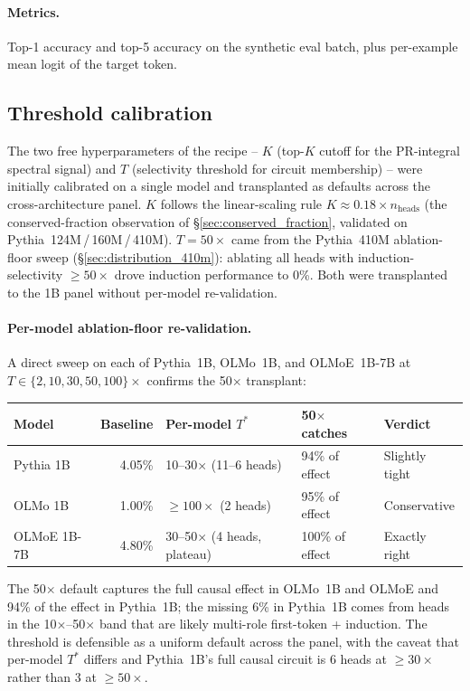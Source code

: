 \documentclass[11pt]{article}
\begin{document}
\paragraph{Metrics.} Top-1 accuracy and top-5 accuracy on the synthetic eval batch, plus per-example mean logit of the target token.

\subsection{Threshold calibration}
\label{sec:threshold_calibration}

The two free hyperparameters of the recipe -- $K$ (top-$K$ cutoff for the PR-integral spectral signal) and $T$ (selectivity threshold for circuit membership) -- were initially calibrated on a single model and transplanted as defaults across the cross-architecture panel. $K$ follows the linear-scaling rule $K \approx 0.18 \times n_{\mathrm{heads}}$ (the conserved-fraction observation of \S\ref{sec:conserved_fraction}, validated on Pythia~124M\,/\,160M\,/\,410M). $T = 50\times$ came from the Pythia~410M ablation-floor sweep (\S\ref{sec:distribution_410m}): ablating all heads with induction-selectivity $\geq 50\times$ drove induction performance to 0\%. Both were transplanted to the 1B panel without per-model re-validation.

\paragraph{Per-model ablation-floor re-validation.} A direct sweep on each of Pythia~1B, OLMo~1B, and OLMoE~1B-7B at $T \in \{2, 10, 30, 50, 100\}\times$ confirms the 50$\times$ transplant:

\begin{center}
\footnotesize
\begin{tabular}{lrlll}
\toprule
Model & Baseline & Per-model $T^*$ & 50$\times$ catches & Verdict \\
\midrule
Pythia 1B   & 4.05\% & 10--30$\times$ (11--6 heads) & 94\% of effect & Slightly tight \\
OLMo 1B     & 1.00\% & $\geq 100\times$ (2 heads) & 95\% of effect & Conservative \\
OLMoE 1B-7B & 4.80\% & 30--50$\times$ (4 heads, plateau) & 100\% of effect & Exactly right \\
\bottomrule
\end{tabular}
\end{center}

The 50$\times$ default captures the full causal effect in OLMo~1B and OLMoE and 94\% of the effect in Pythia~1B; the missing 6\% in Pythia~1B comes from heads in the 10$\times$--50$\times$ band that are likely multi-role first-token + induction. The threshold is defensible as a uniform default across the panel, with the caveat that per-model $T^*$ differs and Pythia~1B's full causal circuit is 6 heads at $\geq 30\times$ rather than 3 at $\geq 50\times$.
\end{document}

